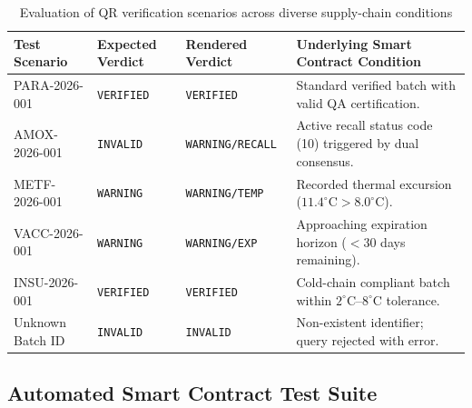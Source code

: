 \documentclass[pdflatex,sn-mathphys-num]{sn-jnl}
\theoremstyle{thmstyleone}
\theoremstyle{thmstyletwo}
\theoremstyle{thmstylethree}
\begin{document}
\begin{table}[htbp]
\centering
\caption{Evaluation of QR verification scenarios across diverse supply-chain conditions}
\label{tab:qr-scenarios}
\vspace{0.5em}
\begin{tabularx}{\textwidth}{lllX}
\toprule
\textbf{Test Scenario} & \textbf{Expected Verdict} & \textbf{Rendered Verdict} & \textbf{Underlying Smart Contract Condition} \\
\midrule
PARA-2026-001 & \texttt{VERIFIED} & \texttt{VERIFIED} & Standard verified batch with valid QA certification. \\
AMOX-2026-001 & \texttt{INVALID} & \texttt{WARNING/RECALL} & Active recall status code (10) triggered by dual consensus. \\
METF-2026-001 & \texttt{WARNING} & \texttt{WARNING/TEMP} & Recorded thermal excursion ($11.4^\circ\text{C} > 8.0^\circ\text{C}$). \\
VACC-2026-001 & \texttt{WARNING} & \texttt{WARNING/EXP} & Approaching expiration horizon ($< 30$ days remaining). \\
INSU-2026-001 & \texttt{VERIFIED} & \texttt{VERIFIED} & Cold-chain compliant batch within $2^\circ\text{C}$--$8^\circ\text{C}$ tolerance. \\
Unknown Batch ID & \texttt{INVALID} & \texttt{INVALID} & Non-existent identifier; query rejected with error. \\
\bottomrule
\end{tabularx}
\end{table}

\subsection{Automated Smart Contract Test Suite}
\end{document}
